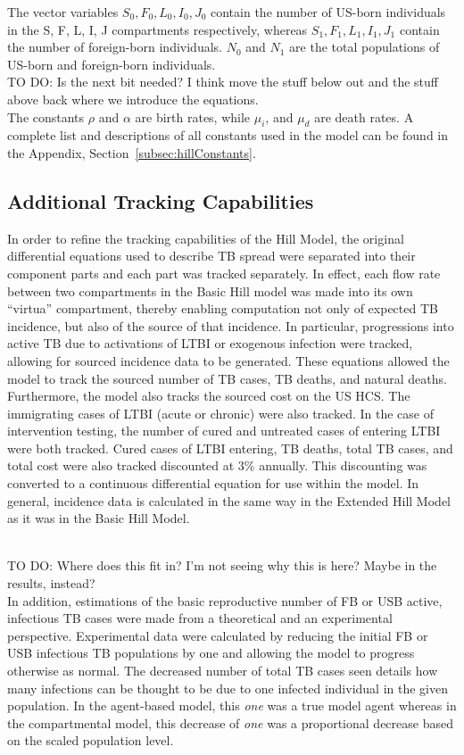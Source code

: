 \documentclass{amsart}
\newcommand{\TODO}[1]{\hfill\\{\huge \color{red} TO DO:} #1 \hfill \\}
\begin{document}
The vector variables $S_0, F_0, L_0, I_0, J_0$ contain the number of US-born
individuals in the S, F, L, I, J compartments respectively, whereas $S_1, F_1,
L_1, I_1, J_1$ contain the number of foreign-born individuals. $N_0$ and $N_1$
are the total populations of US-born and foreign-born individuals. 
\TODO{Is the next bit needed? I think move the stuff below out and the stuff
above back where we introduce the equations.}
The constants $\rho$ and $\alpha$ are birth rates, while $\mu_i$, and $\mu_d$
are death rates. A complete list and descriptions of all constants used in the
model can be found in the Appendix, Section~\ref{subsec:hillConstants}.

\subsection{Additional Tracking Capabilities}
In order to refine the tracking capabilities of the Hill Model, the original
differential equations used to describe TB spread were separated into their
component parts and each part was tracked separately. In effect, each flow rate
between two compartments in the Basic Hill model was made into its own
``virtua'' compartment, thereby enabling computation not only of expected TB
incidence, but also of the source of that incidence. In particular, progressions
into active TB due to activations of LTBI or exogenous infection were tracked,
allowing for sourced incidence data to be generated. These equations allowed the
model to track the sourced number of TB cases, TB deaths, and natural deaths.
Furthermore, the model also tracks the sourced cost on the US HCS. The
immigrating cases of LTBI (acute or chronic) were also tracked. In the case of
intervention testing, the number of cured and untreated cases of entering LTBI
were both tracked. Cured cases of LTBI entering, TB deaths, total TB cases, and
total cost were also tracked discounted at 3\% annually. This discounting was
converted to a continuous differential equation for use within the model. In
general, incidence data is calculated in the same way in the Extended Hill Model
as it was in the Basic Hill Model.

\TODO{Where does this fit in? I'm not seeing why this is here? Maybe in the
results, instead?}
In addition, estimations of the basic reproductive number of FB or USB active,
infectious TB cases were made from a theoretical and an experimental
perspective. Experimental data were calculated by reducing the initial
FB or USB infectious TB populations by one and allowing the
model to progress otherwise as normal. The decreased number of total TB cases
seen details how many infections can be thought to be due to one infected
individual in the given population. In the agent-based model, this \emph{one}
was a true model agent whereas in the compartmental model, this decrease of
\emph{one} was a proportional decrease based on the scaled population level. 
\end{document}
